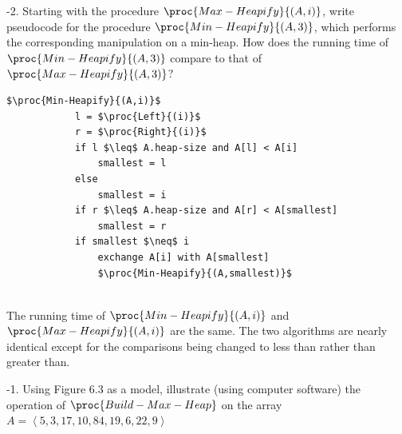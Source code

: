 \documentclass[addpoints,11pt]{exam}
\begin{document}
\begin{questions}
\ifprintanswers
\newpage
\else
\bigskip
\fi


%
%
-2.  Starting with the procedure $\proc{Max-Heapify}{(A,i)}$, write pseudocode for the procedure $\proc{Min-Heapify}{(A,3)}$, which performs the corresponding manipulation on a min-heap.  How does the running time of $\proc{Min-Heapify}{(A,3)}$ compare to that of $\proc{Max-Heapify}{(A,3)}$?

\begin{solutionorbox}
	\begin{lstlisting}[mathescape=true]
	$\proc{Min-Heapify}{(A,i)}$
            l = $\proc{Left}{(i)}$
            r = $\proc{Right}{(i)}$
            if l $\leq$ A.heap-size and A[l] < A[i]
                smallest = l
            else
                smallest = i
            if r $\leq$ A.heap-size and A[r] < A[smallest]
                smallest = r
            if smallest $\neq$ i
                exchange A[i] with A[smallest]
                $\proc{Min-Heapify}{(A,smallest)}$
	\end{lstlisting} \\
	The running time of $\proc{Min-Heapify}{(A,i)}$ and $\proc{Max-Heapify}{(A,i)}$ are the same. The two algorithms are nearly identical except for the comparisons being changed to less than rather than greater than.
\end{solutionorbox}

\ifprintanswers
\newpage
\else
\bigskip
\fi


%
%
-1.  Using Figure 6.3 as a model, illustrate (using computer software) the operation of $\proc{Build-Max-Heap}$ on the array $A = \left< 5, 3, 17, 10, 84, 19, 6, 22, 9\right>$


\end{questions}
\end{document}

